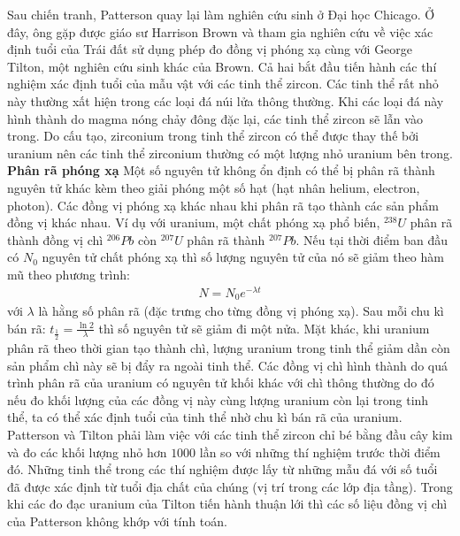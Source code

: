 \begin{multicols}{2}
\begin{figure}[H]
		\vspace*{-10pt}
	\end{figure} 
	Sau chiến tranh, Patterson quay lại làm nghiên cứu sinh ở Đại học Chicago. Ở đây, ông gặp được giáo sư Harrison Brown và tham gia nghiên cứu về việc xác định tuổi của Trái đất sử dụng phép đo đồng vị phóng xạ cùng với George Tilton, một nghiên cứu sinh khác của Brown. Cả hai bắt đầu tiến hành các thí nghiệm xác định tuổi của mẫu vật với các tinh thể zircon. Các tinh thể rất nhỏ này thường xất hiện trong các loại đá núi lửa thông thường. Khi các loại đá này hình thành do magma nóng chảy đông đặc lại, các tinh thể zircon sẽ lẫn vào trong. Do cấu tạo, zirconium trong tinh thể zircon có thể được thay thế bởi uranium nên các tinh thể zirconium thường có một lượng nhỏ uranium bên trong.
	\vskip 0.05cm
	\textbf{\color{timhieukhoahoc}Phân rã phóng xạ}
	\vskip 0.05cm
	Một số nguyên tử không ổn định có thể bị phân rã thành nguyên tử khác kèm theo giải phóng một số hạt (hạt nhân helium, electron, photon). Các đồng vị phóng xạ khác nhau khi phân rã tạo thành các sản phẩm đồng vị khác nhau. Ví dụ với uranium, một chất phóng xạ phổ biến, $^{238}{U}$ phân rã thành đồng vị chì $^{206}{Pb}$ còn $^{207}{U}$ phân rã thành $^{207}{Pb}$.
	\vskip 0.05cm
	Nếu tại thời điểm ban đầu có $N_0$ nguyên tử chất phóng xạ thì số lượng nguyên tử của nó sẽ giảm theo hàm mũ theo phương trình:
	\begin{align*}
		N = N_0 e^{-\lambda t}
	\end{align*}
	với $\lambda$ là hằng số phân rã (đặc trưng cho từng đồng vị phóng xạ). Sau mỗi chu kì bán rã: $t_{\frac{1}{2}} = \frac{\ln 2}{\lambda}$ thì số nguyên tử sẽ giảm đi một nửa.
	\vskip 0.05cm
	Mặt khác, khi uranium phân rã theo thời gian tạo thành chì, lượng uranium trong tinh thể giảm dần còn sản phẩm chì này sẽ bị đẩy ra ngoài tinh thể. Các đồng vị chì hình thành do quá trình phân rã của uranium có nguyên tử khối khác với chì thông thường do đó nếu đo khối lượng của các đồng vị này cùng lượng uranium còn lại trong tinh thể, ta có thể xác định tuổi của tinh thể nhờ chu kì bán rã của uranium.
	\vskip 0.05cm
	Patterson và Tilton phải làm việc với các tinh thể zircon chỉ bé bằng đầu cây kim và đo các khối lượng nhỏ hơn $1000$ lần so với những thí nghiệm trước thời điểm đó. Những tinh thể trong các thí nghiệm được lấy từ những mẫu đá với số tuổi đã được xác định từ tuổi địa chất của chúng (vị trí trong các lớp địa tầng). Trong khi các đo đạc uranium của Tilton tiến hành thuận lới thì các số liệu đồng vị chì của Patterson không khớp với tính toán.
	\vskip 0.1cm

\end{multicols}
